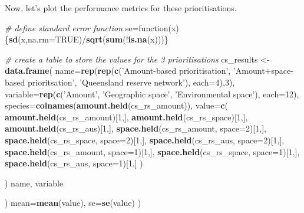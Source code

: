 \documentclass[11pt,]{article}
\newenvironment{Shaded}{\begin{snugshade}}{\end{snugshade}}
\newcommand{\KeywordTok}[1]{\textcolor[rgb]{0.13,0.29,0.53}{\textbf{{#1}}}}
\newcommand{\DataTypeTok}[1]{\textcolor[rgb]{0.13,0.29,0.53}{{#1}}}
\newcommand{\DecValTok}[1]{\textcolor[rgb]{0.00,0.00,0.81}{{#1}}}
\newcommand{\StringTok}[1]{\textcolor[rgb]{0.31,0.60,0.02}{{#1}}}
\newcommand{\CommentTok}[1]{\textcolor[rgb]{0.56,0.35,0.01}{\textit{{#1}}}}
\newcommand{\OtherTok}[1]{\textcolor[rgb]{0.56,0.35,0.01}{{#1}}}
\newcommand{\NormalTok}[1]{{#1}}
\begin{document}
Now, let's plot the performance metrics for these prioritisations.

\begin{Shaded}
\begin{Highlighting}[]
\CommentTok{# define standard error function}
\NormalTok{se=function(x)\{}\KeywordTok{sd}\NormalTok{(x,}\DataTypeTok{na.rm=}\OtherTok{TRUE}\NormalTok{)/}\KeywordTok{sqrt}\NormalTok{(}\KeywordTok{sum}\NormalTok{(!}\KeywordTok{is.na}\NormalTok{(x)))\}}

\CommentTok{# create a table to store the values for the 3 prioritisations}
\NormalTok{cs_results <-}\StringTok{ }\KeywordTok{data.frame}\NormalTok{(}
    \DataTypeTok{name=}\KeywordTok{rep}\NormalTok{(}\KeywordTok{rep}\NormalTok{(}\KeywordTok{c}\NormalTok{(}\StringTok{'Amount-based prioritisation'}\NormalTok{, }
        \StringTok{'Amount+space-based prioritsation'}\NormalTok{, }\StringTok{'Queensland reserve network'}\NormalTok{),}
        \DataTypeTok{each=}\DecValTok{4}\NormalTok{),}\DecValTok{3}\NormalTok{),}
    \DataTypeTok{variable=}\KeywordTok{rep}\NormalTok{(}\KeywordTok{c}\NormalTok{(}\StringTok{'Amount'}\NormalTok{, }\StringTok{'Geographic space'}\NormalTok{, }\StringTok{'Environmental space'}\NormalTok{), }\DataTypeTok{each=}\DecValTok{12}\NormalTok{),}
    \DataTypeTok{species=}\KeywordTok{colnames}\NormalTok{(}\KeywordTok{amount.held}\NormalTok{(cs_rs_amount)),}
    \DataTypeTok{value=}\KeywordTok{c}\NormalTok{(}
        \KeywordTok{amount.held}\NormalTok{(cs_rs_amount)[}\DecValTok{1}\NormalTok{,], }\KeywordTok{amount.held}\NormalTok{(cs_rs_space)[}\DecValTok{1}\NormalTok{,],}
            \KeywordTok{amount.held}\NormalTok{(cs_rs_aus)[}\DecValTok{1}\NormalTok{,],}
        \KeywordTok{space.held}\NormalTok{(cs_rs_amount, }\DataTypeTok{space=}\DecValTok{2}\NormalTok{)[}\DecValTok{1}\NormalTok{,], }\KeywordTok{space.held}\NormalTok{(cs_rs_space, }\DataTypeTok{space=}\DecValTok{2}\NormalTok{)[}\DecValTok{1}\NormalTok{,], }
            \KeywordTok{space.held}\NormalTok{(cs_rs_aus, }\DataTypeTok{space=}\DecValTok{2}\NormalTok{)[}\DecValTok{1}\NormalTok{,],}
        \KeywordTok{space.held}\NormalTok{(cs_rs_amount, }\DataTypeTok{space=}\DecValTok{1}\NormalTok{)[}\DecValTok{1}\NormalTok{,], }\KeywordTok{space.held}\NormalTok{(cs_rs_space, }\DataTypeTok{space=}\DecValTok{1}\NormalTok{)[}\DecValTok{1}\NormalTok{,],}
            \KeywordTok{space.held}\NormalTok{(cs_rs_aus, }\DataTypeTok{space=}\DecValTok{1}\NormalTok{)[}\DecValTok{1}\NormalTok{,]}
    \NormalTok{)}
\NormalTok{) %>%}\StringTok{ }\KeywordTok{group_by}\NormalTok{(}
    \NormalTok{name,}
    \NormalTok{variable}
\NormalTok{) %>%}\StringTok{ }\KeywordTok{summarise}\NormalTok{(}
    \DataTypeTok{mean=}\KeywordTok{mean}\NormalTok{(value),}
    \DataTypeTok{se=}\KeywordTok{se}\NormalTok{(value)}
\NormalTok{)}

}}
\end{Highlighting}
\end{Shaded}
\end{document}
